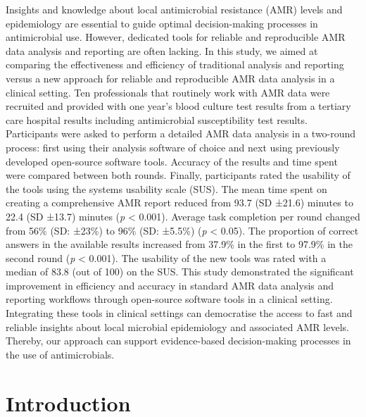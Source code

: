 \documentclass[
]{book}
\begin{document}
Insights and knowledge about local antimicrobial resistance (AMR) levels and epidemiology are essential to guide optimal decision-making processes in antimicrobial use. However, dedicated tools for reliable and reproducible AMR data analysis and reporting are often lacking. In this study, we aimed at comparing the effectiveness and efficiency of traditional analysis and reporting versus a new approach for reliable and reproducible AMR data analysis in a clinical setting. Ten professionals that routinely work with AMR data were recruited and provided with one year's blood culture test results from a tertiary care hospital results including antimicrobial susceptibility test results. Participants were asked to perform a detailed AMR data analysis in a two-round process: first using their analysis software of choice and next using previously developed open-source software tools. Accuracy of the results and time spent were compared between both rounds. Finally, participants rated the usability of the tools using the systems usability scale (SUS). The mean time spent on creating a comprehensive AMR report reduced from 93.7 (SD ±21.6) minutes to 22.4 (SD ±13.7) minutes (\emph{p} \textless{} 0.001). Average task completion per round changed from 56\% (SD: ±23\%) to 96\% (SD: ±5.5\%) (\emph{p} \textless{} 0.05). The proportion of correct answers in the available results increased from 37.9\% in the first to 97.9\% in the second round (\emph{p} \textless{} 0.001). The usability of the new tools was rated with a median of 83.8 (out of 100) on the SUS. This study demonstrated the significant improvement in efficiency and accuracy in standard AMR data analysis and reporting workflows through open-source software tools in a clinical setting. Integrating these tools in clinical settings can democratise the access to fast and reliable insights about local microbial epidemiology and associated AMR levels. Thereby, our approach can support evidence-based decision-making processes in the use of antimicrobials.

\hypertarget{introduction-3}{%
\section{Introduction}\label{introduction-3}}
\end{document}
